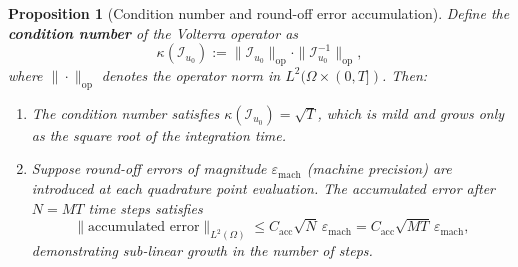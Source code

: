 \documentclass[10pt,a4paper]{amsart}
\newtheorem{proposition}{Proposition}
\begin{document}
\begin{proposition}[Condition number and round-off error accumulation]\label{prop:condition_number}
Define the \textbf{condition number} of the Volterra operator as
\begin{equation}
    \kappa(\mathcal{I}_{u_0}) := \|\mathcal{I}_{u_0}\|_{\mathrm{op}} \cdot \|\mathcal{I}_{u_0}^{-1}\|_{\mathrm{op}},
\end{equation}
where $\|\cdot\|_{\mathrm{op}}$ denotes the operator norm in $L^2(\Omega \times (0,T])$. Then:

\begin{enumerate}[label=(\alph*)]
    \item The condition number satisfies $\kappa(\mathcal{I}_{u_0}) = \sqrt{T}$, which is mild and grows only as the square root of the integration time.
    
    \item Suppose round-off errors of magnitude $\varepsilon_{\mathrm{mach}}$ (machine precision) are introduced at each quadrature point evaluation. The accumulated error after $N = MT$ time steps satisfies
    \begin{equation}\label{eq:roundoff_accumulation}
        \|\text{accumulated error}\|_{L^2(\Omega)} \leq C_{\mathrm{acc}} \sqrt{N} \, \varepsilon_{\mathrm{mach}} = C_{\mathrm{acc}} \sqrt{MT} \, \varepsilon_{\mathrm{mach}},
    \end{equation}
    demonstrating sub-linear growth in the number of steps.
\end{enumerate}
\end{proposition}
\end{document}

